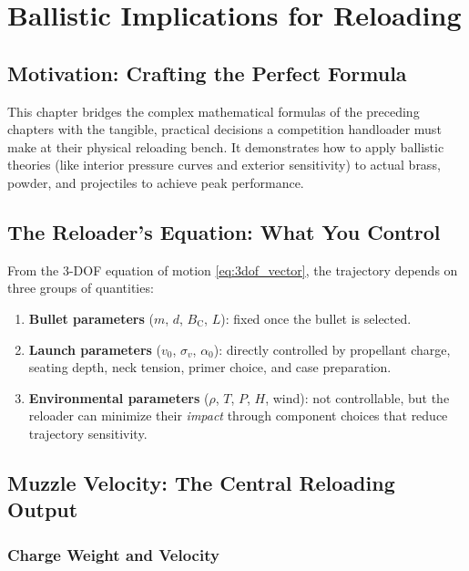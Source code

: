 \documentclass[11pt,twoside,openright]{report}
\newcommand{\Bc}{B_{\mathrm{C}}}
\begin{document}
\chapter{Ballistic Implications for Reloading}
\label{ch:reload_implications}

\section{Motivation: Crafting the Perfect Formula}

This chapter bridges the complex mathematical formulas of the preceding chapters with the tangible, practical decisions a competition handloader must make at their physical reloading bench. It demonstrates how to apply ballistic theories (like interior pressure curves and exterior sensitivity) to actual brass, powder, and projectiles to achieve peak performance.

\section{The Reloader's Equation: What You Control}

From the 3-DOF equation of motion \eqref{eq:3dof_vector}, the trajectory depends on three groups of quantities:

\begin{enumerate}[label=\textbf{\arabic*.}]
  \item \textbf{Bullet parameters} ($m$, $d$, $\Bc$, $L$): fixed once the bullet is selected.
  \item \textbf{Launch parameters} ($v_0$, $\sigma_v$, $\alpha_0$): directly controlled by propellant charge, seating depth, neck tension, primer choice, and case preparation.
  \item \textbf{Environmental parameters} ($\rho$, $T$, $P$, $H$, wind): not controllable, but the reloader can minimize their \emph{impact} through component choices that reduce trajectory sensitivity.
\end{enumerate}

\section{Muzzle Velocity: The Central Reloading Output}

\subsection{Charge Weight and Velocity}
\end{document}
